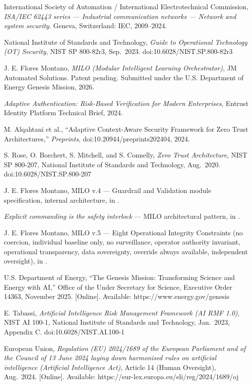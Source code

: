 \cite{ref1} International Society of Automation / International
Electrotechnical Commission, \emph{ISA/IEC 62443 series --- Industrial
communication networks --- Network and system security}. Geneva,
Switzerland: IEC, 2009--2024.

\cite{ref2} National Institute of Standards and Technology, \emph{Guide to
Operational Technology (OT) Security}, NIST SP 800-82r3, Sep.~2023.
doi:10.6028/NIST.SP.800-82r3

\cite{ref3} J. E. Flores Montano, \emph{MILO (Modular Intelligent Learning
Orchestrator)}, JM Automated Solutions. Patent pending. Submitted under
the U.S. Department of Energy Genesis Mission, 2026.

\cite{ref4} \emph{Adaptive Authentication: Risk-Based Verification for
Modern Enterprises}, Entrust Identity Platform Technical Brief, 2024.

\cite{ref5} M. Alqahtani et al., ``Adaptive Context-Aware Security Framework
for Zero Trust Architectures,'' \emph{Preprints},
doi:10.20944/preprints202404, 2024.

\cite{ref6} S. Rose, O. Borchert, S. Mitchell, and S. Connelly, \emph{Zero
Trust Architecture}, NIST SP 800-207, National Institute of Standards
and Technology, Aug.~2020. doi:10.6028/NIST.SP.800-207

\cite{ref7} J. E. Flores Montano, MILO v.4 --- Guardrail and Validation
module specification, internal architecture, in \cite{ref3}.

\cite{ref8} \emph{Explicit commanding is the safety interlock} --- MILO
architectural pattern, in \cite{ref3}.

\cite{ref9} J. E. Flores Montano, MILO v.5 --- Eight Operational Integrity
Constraints (no coercion, individual baseline only, no surveillance,
operator authority invariant, operational transparency, data
sovereignty, override always available, independent oversight), in
\cite{ref3}.

\cite{ref10} U.S. Department of Energy, ``The Genesis Mission: Transforming
Science and Energy with AI,'' Office of the Under Secretary for Science,
Executive Order 14363, November 2025. {[}Online{]}. Available:
https://www.energy.gov/genesis

\cite{ref11} E. Tabassi, \emph{Artificial Intelligence Risk Management
Framework (AI RMF 1.0)}, NIST AI 100-1, National Institute of Standards
and Technology, Jan.~2023, Appendix C. doi:10.6028/NIST.AI.100-1

\cite{ref12} European Union, \emph{Regulation (EU) 2024/1689 of the European
Parliament and of the Council of 13 June 2024 laying down harmonised
rules on artificial intelligence (Artificial Intelligence Act)}, Article
14 (Human Oversight), Aug.~2024. {[}Online{]}. Available:
https://eur-lex.europa.eu/eli/reg/2024/1689/oj

